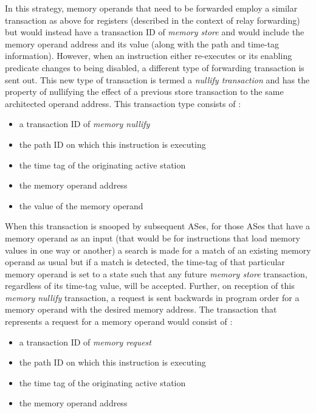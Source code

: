 \documentclass[10pt,dvips]{article}
\begin{document}
In this strategy, memory operands that need to be forwarded
employ a similar transaction as above for registers (described
in the context of relay forwarding) but would instead have
a transaction ID of \textit{memory store} and would
include the memory operand address and its value (along with the
path and time-tag information).
However, when an instruction either re-executes or
its enabling predicate changes to being disabled, a different
type of forwarding transaction is sent out.
This new type of transaction is termed a \textit{nullify transaction}
and has the property of nullifying the effect of a previous
store transaction to the same architected operand address.
This transaction type consists of :
%
\vspace{-0.05in}
\begin{itemize}
\vspace{-0.1in}
\item{a transaction ID of \textit{memory nullify}}
\vspace{-0.1in}
\item{the path ID on which this instruction is executing}
\vspace{-0.1in}
\item{the time tag of the originating active station}
\vspace{-0.1in}
\item{the memory operand address}
\vspace{-0.1in}
\item{the value of the memory operand}
\vspace{-0.1in}
\end{itemize}   
%
When this transaction is snooped by subsequent ASes,
for those ASes that have a memory operand as an input
(that would be for instructions that load memory values in
one way or another)
a search is made for a match of an existing memory
operand as usual but if a match is detected,
the time-tag of that particular memory operand is set to
a state such that any future \textit{memory store} transaction,
regardless of its time-tag value, will be accepted.
Further, on reception of this \textit{memory nullify} transaction,
a request is sent backwards in program order for a memory
operand with the desired memory address.
The transaction that represents a request for a memory
operand would consist of :
%
\vspace{-0.05in}
\begin{itemize}
\vspace{-0.1in}
\item{a transaction ID of \textit{memory request}}
\vspace{-0.1in}
\item{the path ID on which this instruction is executing}
\vspace{-0.1in}
\item{the time tag of the originating active station}
\vspace{-0.1in}
\item{the memory operand address}
\vspace{-0.1in}
\end{itemize}   
\end{document}
